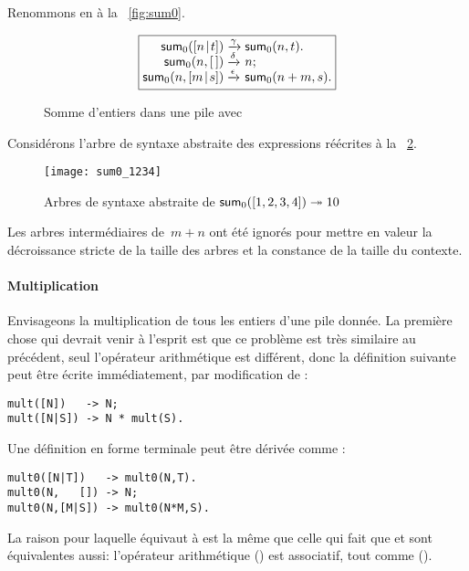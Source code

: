 Renommons  en  à la
\fig~\vref{fig:sum0}.
\begin{figure}[b]
\begin{equation*}
\boxed{%
\begin{array}{@{}r@{\;}l@{\;}l@{}}
\fun{sum}_0(\cons{n}{t}) & \xrightarrow{\smash{\gamma}}
                         & \fun{sum}_0(n,t).\\
      \fun{sum}_0(n,\el) & \xrightarrow{\smash{\delta}} & n;\\
\fun{sum}_0(n,\cons{m}{s}) & \xrightarrow{\smash{\epsilon}}
                           & \fun{sum}_0(n+m,s).
\end{array}}
\end{equation*}
\caption{Somme d'entiers dans une pile avec 
\label{fig:sum0}}
\end{figure}
Considérons l'arbre de syntaxe abstraite des expressions réécrites à
la \fig~\ref{fig:sum0_1234}.
\begin{figure}
\centering
\texttt{[image: sum0\_1234]}
\caption{Arbres de syntaxe abstraite de \(\textsf{sum}_0([1,2,3,4])
  \twoheadrightarrow 10\)\label{fig:sum0_1234}}
\end{figure}
Les arbres intermédiaires de~\(m+n\) ont été ignorés pour mettre en
valeur la décroissance stricte de la taille des arbres et la constance
de la taille du contexte.

\paragraph{Multiplication}

Envisageons la multiplication de tous les entiers d'une pile
donnée. La première chose qui devrait venir à l'esprit est que ce
problème est très similaire au précédent, seul l'opérateur
arithmétique est différent, donc la définition suivante peut être
écrite immédiatement, par modification de :
\begin{verbatim}
mult([N])   -> N;
mult([N|S]) -> N * mult(S).
\end{verbatim}
Une définition en forme terminale peut être dérivée comme
:
\begin{verbatim}
mult0([N|T])   -> mult0(N,T).
mult0(N,   []) -> N;
mult0(N,[M|S]) -> mult0(N*M,S).
\end{verbatim}
La raison pour laquelle  équivaut à 
est la même que celle qui fait que  et 
sont équivalentes aussi: l'opérateur arithmétique (\erlcode{*}) est
associatif, tout comme (\erlcode{+}).

